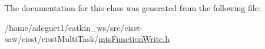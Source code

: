 The documentation for this class was generated from the following file\-:\begin{DoxyCompactItemize}
\item 
/home/adeguet1/catkin\-\_\-ws/src/cisst-\/saw/cisst/cisst\-Multi\-Task/\hyperlink{mts_function_write_8h}{mts\-Function\-Write.\-h}\end{DoxyCompactItemize}
